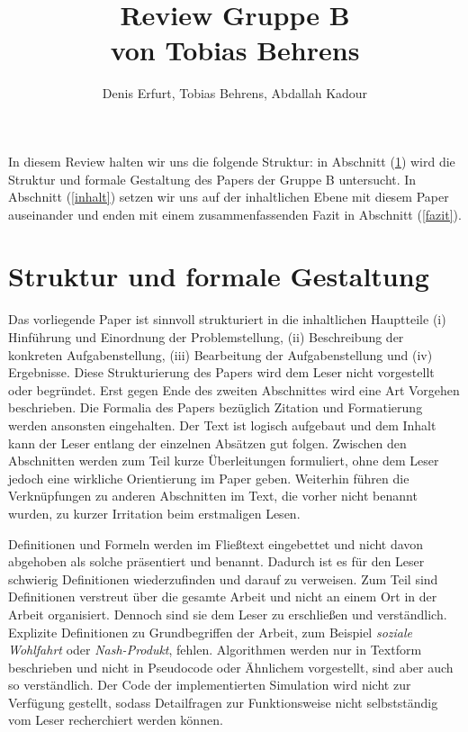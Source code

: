 \documentclass[sigconf]{acmart}
\begin{document}
\title{Review Gruppe B \\ von Tobias Behrens}
\author{Denis Erfurt, Tobias Behrens, Abdallah Kadour}

\maketitle

In diesem Review halten wir uns die folgende Struktur: in Abschnitt (\ref{struktur}) wird die Struktur und formale Gestaltung des Papers der Gruppe B untersucht. In Abschnitt (\ref{inhalt}) setzen wir uns auf der inhaltlichen Ebene mit diesem Paper auseinander und enden mit einem zusammenfassenden Fazit in Abschnitt (\ref{fazit}).

\section{Struktur und formale Gestaltung}
\label{struktur}
Das vorliegende Paper ist sinnvoll strukturiert in die inhaltlichen Hauptteile (i) Hinführung und Einordnung der Problemstellung, (ii) Beschreibung der konkreten Aufgabenstellung, (iii) Bearbeitung der Aufgabenstellung und (iv) Ergebnisse. Diese Strukturierung des Papers wird dem Leser nicht vorgestellt oder begründet. Erst gegen Ende des zweiten Abschnittes wird eine Art Vorgehen beschrieben. Die Formalia des Papers bezüglich Zitation und Formatierung werden ansonsten eingehalten. Der Text ist logisch aufgebaut und dem Inhalt kann der Leser entlang der einzelnen Absätzen gut folgen. Zwischen den Abschnitten werden zum Teil kurze Überleitungen formuliert, ohne dem Leser jedoch eine wirkliche Orientierung im Paper geben. Weiterhin führen die Verknüpfungen zu anderen Abschnitten im Text, die vorher nicht benannt wurden, zu kurzer Irritation beim erstmaligen Lesen.

Definitionen und Formeln werden im Fließtext eingebettet und nicht davon abgehoben als solche präsentiert und benannt. Dadurch ist es für den Leser schwierig Definitionen wiederzufinden und darauf zu verweisen. Zum Teil sind Definitionen verstreut über die gesamte Arbeit und nicht an einem Ort in der Arbeit organisiert. Dennoch sind sie dem Leser zu erschließen und verständlich. Explizite Definitionen zu Grundbegriffen der Arbeit, zum Beispiel \textit{soziale Wohlfahrt} oder \textit{Nash-Produkt}, fehlen. Algorithmen werden nur in Textform beschrieben und nicht in Pseudocode oder Ähnlichem vorgestellt, sind aber auch so  verständlich. Der Code der implementierten Simulation wird nicht zur Verfügung gestellt, sodass Detailfragen zur Funktionsweise nicht selbstständig vom Leser recherchiert werden können.
\end{document}
